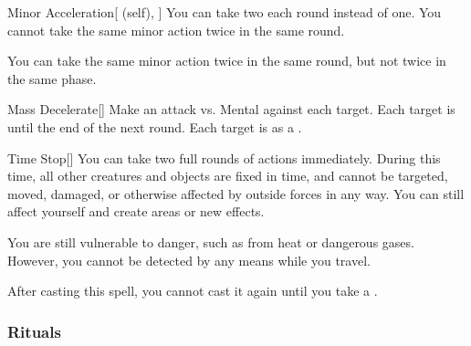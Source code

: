 \lowercase{\hypertarget{spell:Minor Acceleration}{}}\label{spell:Minor Acceleration}
\begin{attuneability}[Rank 6]{\hypertarget{spell:Minor Acceleration}{Minor Acceleration}}[ (self), ]
You can take two  each round instead of one.
You cannot take the same minor action twice in the same round.

\rankline
{} You can take the same minor action twice in the same round, but not twice in the same phase.

\end{attuneability}
\vspace{0.25em}



\lowercase{\hypertarget{spell:Mass Decelerate}{}}\label{spell:Mass Decelerate}
\begin{freeability}[Rank 7]{\hypertarget{spell:Mass Decelerate}{Mass Decelerate}}[]
Make an attack vs. Mental against each target.
\hit Each target is  until the end of the next round.
\crit Each target is  as a .

\end{freeability}
\vspace{0.25em}



\lowercase{\hypertarget{spell:Time Stop}{}}\label{spell:Time Stop}
\begin{freeability}[Rank 8]{\hypertarget{spell:Time Stop}{Time Stop}}[]
You can take two full rounds of actions immediately.
During this time, all other creatures and objects are fixed in time, and cannot be targeted, moved, damaged, or otherwise affected by outside forces in any way.
You can still affect yourself and create areas or new effects.

You are still vulnerable to danger, such as from heat or dangerous gases.
However, you cannot be detected by any means while you travel.

After casting this spell, you cannot cast it again until you take a .

\end{freeability}
\vspace{0.25em}



\subsubsection{Rituals}


